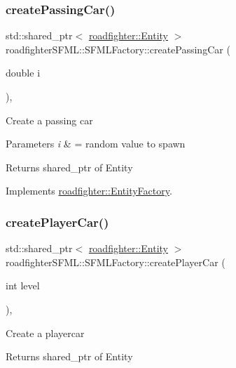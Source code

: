 \subsubsection{\texorpdfstring{create\+Passing\+Car()}{createPassingCar()}}
{\footnotesize\ttfamily std\+::shared\+\_\+ptr$<$ \hyperlink{classroadfighter_1_1Entity}{roadfighter\+::\+Entity} $>$ roadfighter\+S\+F\+M\+L\+::\+S\+F\+M\+L\+Factory\+::create\+Passing\+Car (\begin{DoxyParamCaption}\item[{double}]{i }\end{DoxyParamCaption})\hspace{0.3cm}{\ttfamily [override]}, {\ttfamily [virtual]}}

Create a passing car 
\begin{DoxyParams}{Parameters}
{\em i} & = random value to spawn \\
\hline
\end{DoxyParams}
\begin{DoxyReturn}{Returns}
shared\+\_\+ptr of Entity 
\end{DoxyReturn}


Implements \hyperlink{classroadfighter_1_1EntityFactory_ab318794f4effc0c2195fae5da267d900}{roadfighter\+::\+Entity\+Factory}.

\mbox{\label{classroadfighterSFML_1_1SFMLFactory_acb966ae41ef0a928c4adc34b4c97cedb}} 
\subsubsection{\texorpdfstring{create\+Player\+Car()}{createPlayerCar()}}
{\footnotesize\ttfamily std\+::shared\+\_\+ptr$<$ \hyperlink{classroadfighter_1_1Entity}{roadfighter\+::\+Entity} $>$ roadfighter\+S\+F\+M\+L\+::\+S\+F\+M\+L\+Factory\+::create\+Player\+Car (\begin{DoxyParamCaption}\item[{int}]{level }\end{DoxyParamCaption})\hspace{0.3cm}{\ttfamily [override]}, {\ttfamily [virtual]}}

Create a playercar \begin{DoxyReturn}{Returns}
shared\+\_\+ptr of Entity 
\end{DoxyReturn}


